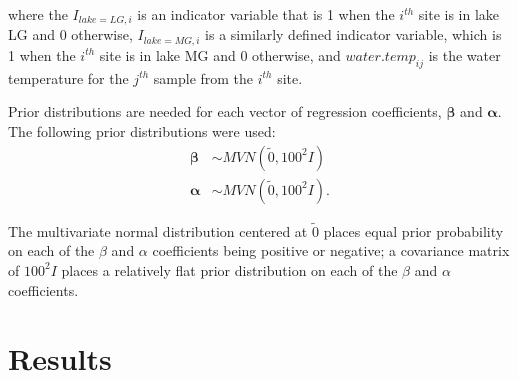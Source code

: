 \documentclass[12pt]{article}\usepackage[]{graphicx}\usepackage[]{color}
\begin{document}
\noindent where the $I_{lake = LG, i}$ is an indicator variable that is 1 when the $i^{th}$ site is in lake LG and 0 otherwise, $I_{lake = MG, i}$ is a similarly defined indicator variable, which is 1 when the $i^{th}$ site is in lake MG and 0 otherwise, and $water.temp_{ij}$ is the water temperature for the $j^{th}$ sample from the $i^{th}$ site. 

Prior distributions are needed for each vector of regression coefficients, $\bm\beta$ and $\bm\alpha$. The following prior distributions were used: 
$$
\begin{aligned}
\bm{\beta} &\sim MVN(\tilde 0, 100^2I)\\
\bm{\alpha} &\sim MVN(\tilde 0, 100^2I).
\end{aligned}
$$

\noindent The multivariate normal distribution centered at $\tilde 0$ places equal prior probability on each of the $\beta$ and $\alpha$ coefficients being positive or negative; a covariance matrix of $100^2 I$ places a relatively flat prior distribution on each of the $\beta$ and $\alpha$ coefficients.






































\section{Results}
\end{document}

